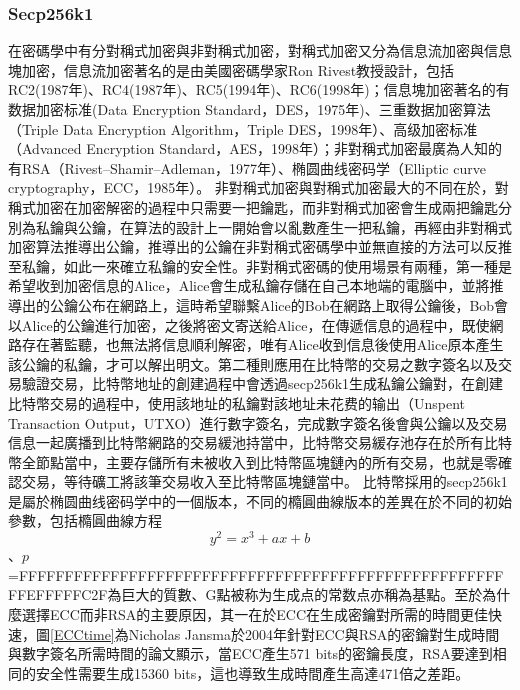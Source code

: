			\subsubsection{Secp256k1}
			在密碼學中有分對稱式加密與非對稱式加密，對稱式加密又分為信息流加密與信息塊加密，信息流加密著名的是由美國密碼學家Ron Rivest教授設計，包括RC2(1987年)\supercite{OnthedesignandsecurityofRC2}、RC4(1987年)\supercite{Rc4}、RC5(1994年)\supercite{TheRC5encryptionalgorithm}、RC6(1998年)\supercite{TheRC6blockcipher.v1.1August201998}；信息塊加密著名的有数据加密标准(Data Encryption Standard，DES，1975年)\supercite{Dataencryptionstandard}、三重数据加密算法（Triple Data Encryption Algorithm，Triple DES，1998年）\supercite{TrippleDataEncryptionAlgorithmModesofOperation}、高级加密标准（Advanced Encryption Standard，AES，1998年）\supercite{ThedesignofRijndael:AES-theadvancedencryptionstandard}；非對稱式加密最廣為人知的有RSA（Rivest–Shamir–Adleman，1977年）\supercite{Cryptographiccommunicationssystemandmethod}、椭圆曲线密码学（Elliptic curve cryptography，ECC，1985年）\supercite{Ellipticcurvecryptosystems}。
			非對稱式加密與對稱式加密最大的不同在於，對稱式加密在加密解密的過程中只需要一把鑰匙，而非對稱式加密會生成兩把鑰匙分別為私鑰與公鑰，在算法的設計上一開始會以亂數產生一把私鑰，再經由非對稱式加密算法推導出公鑰，推導出的公鑰在非對稱式密碼學中並無直接的方法可以反推至私鑰，如此一來確立私鑰的安全性。非對稱式密碼的使用場景有兩種，第一種是希望收到加密信息的Alice，Alice會生成私鑰存儲在自己本地端的電腦中，並將推導出的公鑰公布在網路上，這時希望聯繫Alice的Bob在網路上取得公鑰後，Bob會以Alice的公鑰進行加密，之後將密文寄送給Alice，在傳遞信息的過程中，既使網路存在著監聽，也無法將信息順利解密，唯有Alice收到信息後使用Alice原本產生該公鑰的私鑰，才可以解出明文。第二種則應用在比特幣的交易之數字簽名以及交易驗證交易，比特幣地址的創建過程中會透過secp256k1生成私鑰公鑰對，在創建比特幣交易的過程中，使用該地址的私鑰對該地址未花费的输出（Unspent Transaction Output，UTXO）進行數字簽名，完成數字簽名後會與公鑰以及交易信息一起廣播到比特幣網路的交易緩池持當中，比特幣交易緩存池存在於所有比特幣全節點當中，主要存儲所有未被收入到比特幣區塊鏈內的所有交易，也就是零確認交易，等待礦工將該筆交易收入至比特幣區塊鏈當中。
			比特幣採用的secp256k1是屬於椭圆曲线密码学中的一個版本，不同的橢圓曲線版本的差異在於不同的初始參數，包括橢圓曲線方程$$y^2=x^3+ax+b$$、$p$=FFFFFFFFFFFFFFFFFFFFFFFFFFFFFFFFFFFFFFFFFFFFFFFFFFFFFFFEFFFFFC2F為巨大的質數、G點被称为⽣成点的常数点亦稱為基點。至於為什麼選擇ECC而非RSA的主要原因，其一在於ECC在生成密鑰對所需的時間更佳快速，圖\ref{ECCtime}為Nicholas Jansma於2004年針對ECC與RSA的密鑰對生成時間與數字簽名所需時間的論文\supercite{Performancecomparisonofellipticcurveandrsadigitalsignatures}顯示，當ECC產生571 bits的密鑰長度，RSA要達到相同的安全性需要生成15360 bits，這也導致生成時間產生高達471倍之差距。
			
